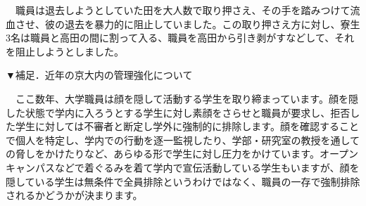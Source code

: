 {\begin{tcolorbox}[colback=white, colbacktitle=gray!30!white, coltitle=black, title=熊野寮生３名に対する無期停学処分の撤回を求める声明,breakable]
    　職員は退去しようとしていた田を大人数で取り押さえ、その手を踏みつけて流血させ、彼の退去を暴力的に阻止していました。この取り押さえ方に対し、寮生3名は職員と高田の間に割って入る、職員を高田から引き剥がすなどして、それを阻止しようとしました。
    
    \vspace{5mm}
    \noindent ▼補足．近年の京大内の管理強化について
    
    　ここ数年、大学職員は顔を隠して活動する学生を取り締まっています。顔を隠した状態で学内に入ろうとする学生に対し素顔をさらせと職員が要求し、拒否した学生に対しては不審者と断定し学外に強制的に排除します。顔を確認することで個人を特定し、学内での行動を逐一監視したり、学部・研究室の教授を通しての脅しをかけたりなど、あらゆる形で学生に対し圧力をかけています。オープンキャンパスなどで着ぐるみを着て学内で宣伝活動している学生もいますが、顔を隠している学生は無条件で全員排除というわけではなく、職員の一存で強制排除されるかどうかが決まります。
\end{tcolorbox}
}